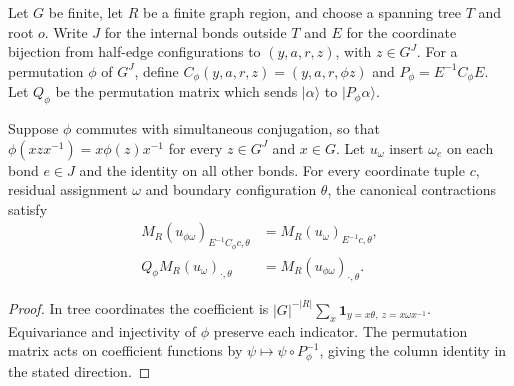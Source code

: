 \begin{definition}%
    \label{def:peps_regular_cycle_permutation}
    \leanok
    Let $G$ be finite, let $R$ be a finite graph region, and choose a spanning
    tree $T$ and root $o$. Write $J$ for the internal bonds outside $T$ and
    $E$ for the coordinate bijection from half-edge configurations to
    $(y,a,r,z)$, with $z\in G^J$. For a permutation $\phi$ of $G^J$, define
    $C_\phi(y,a,r,z)=(y,a,r,\phi z)$ and
    $P_\phi=E^{-1}C_\phi E$. Let $Q_\phi$ be the permutation matrix which
    sends $|\alpha\rangle$ to $|P_\phi\alpha\rangle$.
\end{definition}

\begin{lemma}%
    \label{thm:peps_regular_cycle_permutation_columns}
    \leanok
    Suppose $\phi$ commutes with simultaneous conjugation, so that
    $\phi(xzx^{-1})=x\phi(z)x^{-1}$ for every $z\in G^J$ and $x\in G$.
    Let $u_\omega$ insert $\omega_e$ on each bond $e\in J$ and the identity
    on all other bonds. For every coordinate tuple $c$, residual assignment
    $\omega$ and boundary configuration $\theta$, the canonical
    contractions satisfy
    \begin{align}
        M_R(u_{\phi\omega})_{E^{-1}C_\phi c,\theta}
         & =M_R(u_\omega)_{E^{-1}c,\theta},     \\
        Q_\phi M_R(u_\omega)_{\cdot,\theta}
         & =M_R(u_{\phi\omega})_{\cdot,\theta}.
    \end{align}
\end{lemma}
\begin{proof}\leanok
    In tree coordinates the coefficient is
    $|G|^{-|R|}\sum_x\mathbf 1_{y=x\theta,\ z=x\omega x^{-1}}$.
    Equivariance and injectivity of $\phi$ preserve each indicator.
    The permutation matrix acts on coefficient functions by
    $\psi\mapsto\psi\circ P_\phi^{-1}$, giving the column identity in the
    stated direction.
\end{proof}

